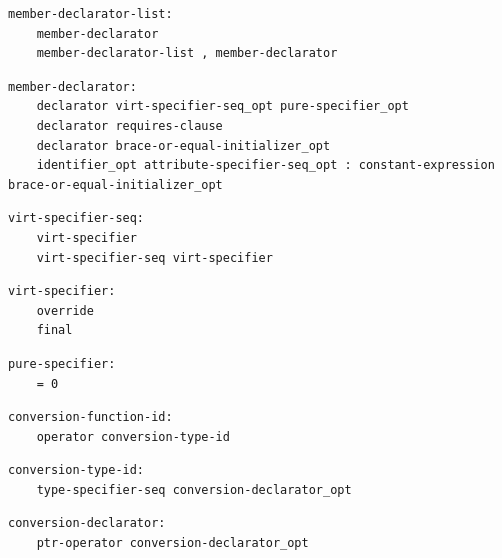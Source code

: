 \noindent\textbf{\texttt{}}\par
\begin{lstlisting}
member-declarator-list:
    member-declarator
    member-declarator-list , member-declarator
\end{lstlisting}

\noindent\textbf{\texttt{}}\par
\begin{lstlisting}
member-declarator:
    declarator virt-specifier-seq_opt pure-specifier_opt
    declarator requires-clause
    declarator brace-or-equal-initializer_opt
    identifier_opt attribute-specifier-seq_opt : constant-expression brace-or-equal-initializer_opt
\end{lstlisting}

\noindent\textbf{\texttt{}}\par
\begin{lstlisting}
virt-specifier-seq:
    virt-specifier
    virt-specifier-seq virt-specifier
\end{lstlisting}

\noindent\textbf{\texttt{}}\par
\begin{lstlisting}
virt-specifier:
    override
    final
\end{lstlisting}

\noindent\textbf{\texttt{}}\par
\begin{lstlisting}
pure-specifier:
    = 0
\end{lstlisting}

\noindent\textbf{\texttt{}}\par
\begin{lstlisting}
conversion-function-id:
    operator conversion-type-id
\end{lstlisting}

\noindent\textbf{\texttt{}}\par
\begin{lstlisting}
conversion-type-id:
    type-specifier-seq conversion-declarator_opt
\end{lstlisting}

\noindent\textbf{\texttt{}}\par
\begin{lstlisting}
conversion-declarator:
    ptr-operator conversion-declarator_opt
\end{lstlisting}

